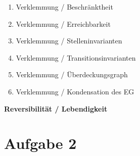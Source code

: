 \documentclass[10pt]{scrartcl}
\begin{document}
\begin{enumerate}
\item{Verklemmung / Beschränktheit}\\

\item{Verklemmung / Erreichbarkeit}\\

\item{Verklemmung / Stelleninvarianten}\\

\item{Verklemmung / Transitionsinvarianten}\\

\item{Verklemmung / Überdeckungsgraph}\\

\item{Verklemmung / Kondensation des EG}\\

\end{enumerate}
\textbf{Reversibilität / Lebendigkeit}


\section{Aufgabe 2}
\end{document}
